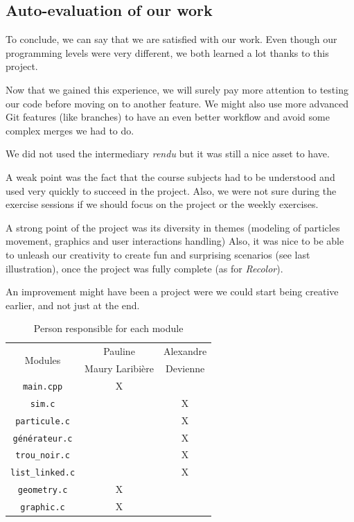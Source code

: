 \documentclass[a4paper]{article} %
\begin{document}
\begin{multicols*}{2}
\subsection{Auto-evaluation of our work}
To conclude, we can say that we are satisfied with our work.
Even though our programming levels were very different,
we both learned a lot thanks to this project.

Now that we gained this experience, we will surely pay more attention to testing our code
before moving on to another feature.
We might also use more advanced Git features (like branches) to have an even better workflow and
avoid some complex merges we had to do.

We did not used the intermediary \emph{rendu} but it was still a nice asset to have.

A weak point was the fact that the course subjects had to be understood
and used very quickly to succeed in the project.
Also, we were not sure during the exercise sessions if we should focus
on the project or the weekly exercises.

A strong point of the project was its diversity in themes (modeling of particles movement, graphics and user interactions handling)
Also, it was nice to be able to unleash our creativity to create fun and surprising scenarios (see last illustration),
once the project was fully complete (as for \emph{Recolor}).

An improvement might have been a project were we could start being creative earlier, and not just at the end.

\begin{table}[H]
\begin{center}
\begin{tabular}{|c|c|c|}
\hline
\multicolumn{1}{|c|}{\multirow{2}{*}{Modules}} & Pauline & Alexandre \\
 & Maury Laribière &  Devienne\\
\hline
\hline
\texttt{main.cpp} &  X &\\
\hline
\texttt{sim.c} & &X\\
\hline
\texttt{particule.c} & & X\\
\hline
\texttt{générateur.c} & & X\\
\hline
\texttt{trou\_noir.c} & & X\\
\hline
\texttt{list\_linked.c} & &X\\
\hline
\texttt{geometry.c} & X&\\
\hline
\texttt{graphic.c} & X&\\
\hline
\end{tabular}
\end{center}
\caption{Person responsible for each module}
\label{tab-module}
\end{table}


\end{multicols*}
\end{document}

